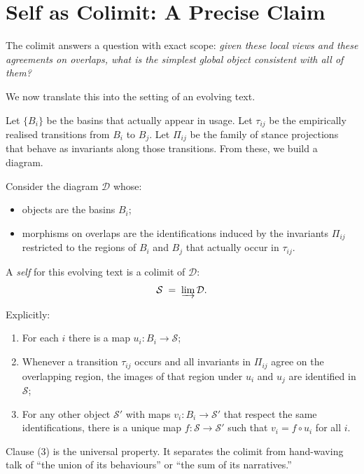 \documentclass[12pt,a4paper]{article}
\begin{document}
\section{Self as Colimit: A Precise Claim}

The colimit answers a question with exact scope: \emph{given these local views and these agreements on overlaps, what is the simplest global object consistent with all of them?}

We now translate this into the setting of an evolving text.

Let $\{B_i\}$ be the basins that actually appear in usage. Let $\tau_{ij}$ be the empirically realised transitions from $B_i$ to $B_j$. Let $\Pi_{ij}$ be the family of stance projections that behave as invariants along those transitions. From these, we build a diagram.

\begin{formalbox}[title={Self as colimit over stance-glued basins}]
Consider the diagram $\mathcal{D}$ whose:
\begin{itemize}
  \item objects are the basins $B_i$;
  \item morphisms on overlaps are the identifications induced by the invariants $\Pi_{ij}$ restricted to the regions of $B_i$ and $B_j$ that actually occur in $\tau_{ij}$.
\end{itemize}
A \emph{self} for this evolving text is a colimit of $\mathcal{D}$:
\[
\mathcal{S} \;=\; \varinjlim \mathcal{D}.
\]

Explicitly:
\begin{enumerate}
  \item For each $i$ there is a map $u_i : B_i \to \mathcal{S}$;
  \item Whenever a transition $\tau_{ij}$ occurs and all invariants in $\Pi_{ij}$ agree on the overlapping region, the images of that region under $u_i$ and $u_j$ are identified in $\mathcal{S}$;
  \item For any other object $\mathcal{S}'$ with maps $v_i : B_i \to \mathcal{S}'$ that respect the same identifications, there is a unique map $f: \mathcal{S} \to \mathcal{S}'$ such that $v_i = f \circ u_i$ for all $i$.
\end{enumerate}
\end{formalbox}

Clause (3) is the universal property. It separates the colimit from hand-waving talk of ``the union of its behaviours'' or ``the sum of its narratives.''
\end{document}

